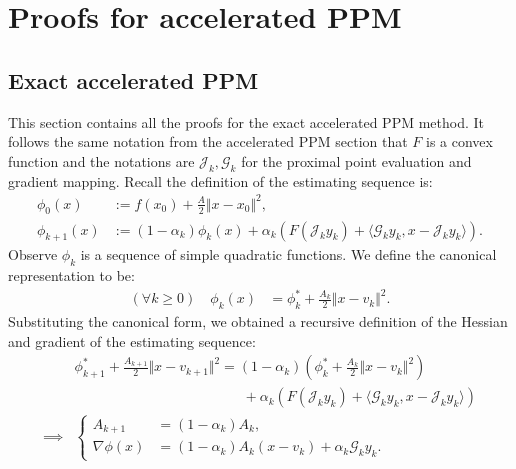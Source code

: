 \documentclass[12pt]{article}
\begin{document}
    
\section{Proofs for accelerated PPM}
    \subsection{Exact accelerated PPM}\label{sec:app:exct-acc-ppm}
        This section contains all the proofs for the exact accelerated PPM method. 
        It follows the same notation from the accelerated PPM section that $F$ is a convex function and the notations are $\mathcal J_k, \mathcal G_k$ for the proximal point evaluation and gradient mapping. 
        Recall the definition of the estimating sequence is: 
        \begin{align*}
            \phi_0(x) &:= f(x_0) + \frac{A}{2}\Vert x - x_0\Vert^2, 
            \\
            \phi_{k + 1}(x) &:= 
            (1 - \alpha_k)\phi_k(x)
            + 
            \alpha_k(F(\mathcal J_k y_k) + \langle \mathcal G_k y_k, x - \mathcal J_k y_k\rangle). 
        \end{align*}
        Observe $\phi_k$ is a sequence of simple quadratic functions. 
        We define the canonical representation to be: 
        \begin{align*}
            (\forall k \ge 0) \quad 
            \phi_k(x) &= \phi_k^* + \frac{A_k}{2} \Vert x - v_k\Vert^2. 
        \end{align*}
        Substituting the canonical form, we obtained a recursive definition of the Hessian and gradient of the estimating sequence: 
        \begin{align*}
            &
            \phi_{k+ 1}^* + \frac{A_{k + 1}}{2}\Vert x - v_{k + 1}\Vert^2
            = 
            (1 - \alpha_k)
            \left(\phi_k^* + \frac{A_k}{2}\Vert x - v_k\Vert^2\right)
            \\ & \hspace{12em}
                + 
                \alpha_k(F(\mathcal J_k y_k) + \langle \mathcal G_k y_k, x - \mathcal J_k y_k\rangle)
            \\
            \implies 
            &
            \left\lbrace
            \begin{aligned}
                A_{k + 1} 
                &= (1 - \alpha_k)A_k, 
                \\
                \nabla \phi(x)
                &= 
                (1 - \alpha_k)A_k(x - v_k) + \alpha_k \mathcal G_ky_k. 
            \end{aligned}
            \right.
        \end{align*}
\end{document}
